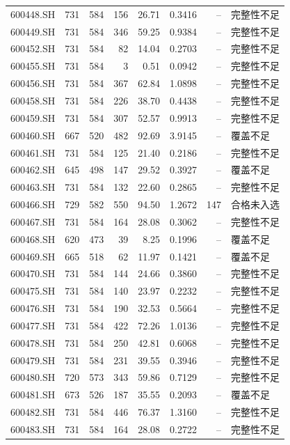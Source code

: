 \documentclass[10pt,a4paper]{article}
\begin{document}
\begin{longtable}{lrrr r r r l}
600448.SH & 731 & 584 & 156 & 26.71 & 0.3416 & -- & 完整性不足\\
600449.SH & 731 & 584 & 346 & 59.25 & 0.9384 & -- & 完整性不足\\
600452.SH & 731 & 584 & 82 & 14.04 & 0.2703 & -- & 完整性不足\\
600455.SH & 731 & 584 & 3 & 0.51 & 0.0942 & -- & 完整性不足\\
600456.SH & 731 & 584 & 367 & 62.84 & 1.0898 & -- & 完整性不足\\
600458.SH & 731 & 584 & 226 & 38.70 & 0.4438 & -- & 完整性不足\\
600459.SH & 731 & 584 & 307 & 52.57 & 0.9913 & -- & 完整性不足\\
600460.SH & 667 & 520 & 482 & 92.69 & 3.9145 & -- & 覆盖不足\\
600461.SH & 731 & 584 & 125 & 21.40 & 0.2186 & -- & 完整性不足\\
600462.SH & 645 & 498 & 147 & 29.52 & 0.3927 & -- & 覆盖不足\\
600463.SH & 731 & 584 & 132 & 22.60 & 0.2865 & -- & 完整性不足\\
600466.SH & 729 & 582 & 550 & 94.50 & 1.2672 & 147 & 合格未入选\\
600467.SH & 731 & 584 & 164 & 28.08 & 0.3062 & -- & 完整性不足\\
600468.SH & 620 & 473 & 39 & 8.25 & 0.1996 & -- & 覆盖不足\\
600469.SH & 665 & 518 & 62 & 11.97 & 0.1421 & -- & 覆盖不足\\
600470.SH & 731 & 584 & 144 & 24.66 & 0.3860 & -- & 完整性不足\\
600475.SH & 731 & 584 & 140 & 23.97 & 0.2232 & -- & 完整性不足\\
600476.SH & 731 & 584 & 190 & 32.53 & 0.5664 & -- & 完整性不足\\
600477.SH & 731 & 584 & 422 & 72.26 & 1.0136 & -- & 完整性不足\\
600478.SH & 731 & 584 & 250 & 42.81 & 0.6068 & -- & 完整性不足\\
600479.SH & 731 & 584 & 231 & 39.55 & 0.3946 & -- & 完整性不足\\
600480.SH & 720 & 573 & 343 & 59.86 & 0.7129 & -- & 完整性不足\\
600481.SH & 673 & 526 & 187 & 35.55 & 0.2093 & -- & 覆盖不足\\
600482.SH & 731 & 584 & 446 & 76.37 & 1.3160 & -- & 完整性不足\\
600483.SH & 731 & 584 & 164 & 28.08 & 0.2722 & -- & 完整性不足\\

\end{longtable}
\end{document}
